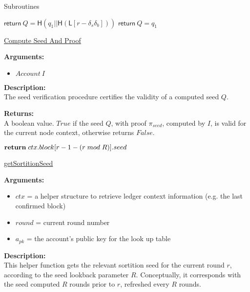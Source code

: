 \documentclass[10pt,a4paper]{article}
\begin{document}
\begin{section}{Subroutines}
\begin{algorithm}[H]
\begin{algorithmic}[1]
            \State $\mathsf{return} \ Q = \mathsf{H}(q_1||\mathsf{H}(\mathsf{L}[r-\delta_s\delta_b]))$
        \Else
            \State $\mathsf{return} \ Q = q_1$
        \EndIf
    \EndFunction
    \end{algorithmic}
    \caption{\underline{Compute Seed And Proof}}
\end{algorithm}


\noindent \textbf{Arguments:}
\begin{itemize}
    \item $Account \ I$
  \end{itemize}


\noindent \textbf{Description:}\\ The seed verification procedure certifies the validity of a computed seed $Q$.


\noindent \textbf{Returns:}\\ A boolean value. $True$ if the seed $Q$, with proof $\pi_{seed}$, computed by $I$,
    is valid for the current node context, otherwise returns $False$.


\begin{algorithm}[H]\label{algo:get-sortition-seed}
    \begin{algorithmic}[1]
        
            $\Return\;ctx.block[r-1-(r\;mod\;R)].seed$

        \EndFunction
    \end{algorithmic}
    \caption{\underline{getSortitionSeed}}
\end{algorithm}

\noindent \textbf{Arguments:}
\begin{itemize}
    \item $ctx$ = a helper structure to retrieve ledger context information (e.g. the last confirmed block)
    \item $round$ = current round number
    \item $a_{pk}$ = the account's public key for the look up table
  \end{itemize}


\noindent \textbf{Description:}\\
This helper function gets the relevant sortition seed for the current round $r$, according to the seed 
lookback parameter $R$.
Conceptually, it corresponds with the seed computed $R$ rounds prior to $r$, refreshed every $R$ rounds.


\end{section}
\end{document}
